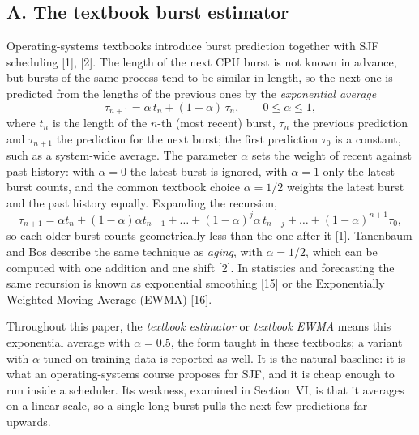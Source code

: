 \documentclass{article}
\begin{document}
\subsection*{A. The textbook burst estimator}
Operating-systems textbooks introduce burst prediction together with SJF scheduling [1], [2]. The length of the next CPU burst is not known in advance, but bursts of the same process tend to be similar in length, so the next one is predicted from the lengths of the previous ones by the \emph{exponential average}
\begin{equation}
\tau_{n+1}=\alpha\,t_n+(1-\alpha)\,\tau_n ,\qquad 0\le\alpha\le1,
\end{equation}
where $t_n$ is the length of the $n$-th (most recent) burst, $\tau_n$ the previous prediction and $\tau_{n+1}$ the prediction for the next burst; the first prediction $\tau_0$ is a constant, such as a system-wide average. The parameter $\alpha$ sets the weight of recent against past history: with $\alpha=0$ the latest burst is ignored, with $\alpha=1$ only the latest burst counts, and the common textbook choice $\alpha=1/2$ weights the latest burst and the past history equally. Expanding the recursion,
\begin{equation}
\tau_{n+1}=\alpha t_n+(1-\alpha)\alpha t_{n-1}+\dots+(1-\alpha)^{j}\alpha\, t_{n-j}+\dots+(1-\alpha)^{n+1}\tau_0 ,
\end{equation}
so each older burst counts geometrically less than the one after it [1]. Tanenbaum and Bos describe the same technique as \emph{aging}, with $\alpha=1/2$, which can be computed with one addition and one shift [2]. In statistics and forecasting the same recursion is known as exponential smoothing [15] or the Exponentially Weighted Moving Average (EWMA) [16].

Throughout this paper, the \emph{textbook estimator} or \emph{textbook EWMA} means this exponential average with $\alpha=0.5$, the form taught in these textbooks; a variant with $\alpha$ tuned on training data is reported as well. It is the natural baseline: it is what an operating-systems course proposes for SJF, and it is cheap enough to run inside a scheduler. Its weakness, examined in Section~VI, is that it averages on a linear scale, so a single long burst pulls the next few predictions far upwards.
\end{document}
